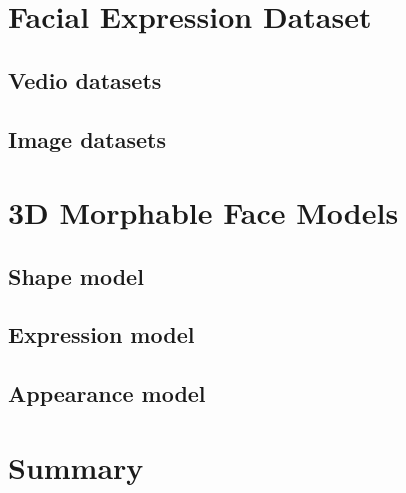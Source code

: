 \section{Facial Expression Dataset}
\label{sec:fed}

\subsection{Vedio datasets}

\subsection{Image datasets}

\section{3D Morphable Face Models}
\label{sec:3dmm}
\subsection{Shape model}
\subsection{Expression model}
\subsection{Appearance model}


\section{Summary}



